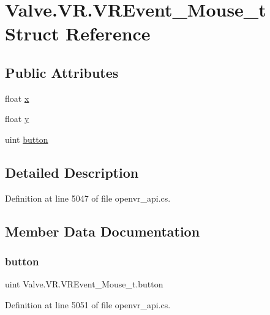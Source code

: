 \hypertarget{struct_valve_1_1_v_r_1_1_v_r_event___mouse__t}{}\section{Valve.\+V\+R.\+V\+R\+Event\+\_\+\+Mouse\+\_\+t Struct Reference}
\label{struct_valve_1_1_v_r_1_1_v_r_event___mouse__t}
\subsection*{Public Attributes}
\begin{DoxyCompactItemize}
\item 
float \mbox{\hyperlink{struct_valve_1_1_v_r_1_1_v_r_event___mouse__t_a0ae7a397a8afdd916e32ae514757c4f8}{x}}
\item 
float \mbox{\hyperlink{struct_valve_1_1_v_r_1_1_v_r_event___mouse__t_acca7abe627d56fa8b2dc3e67cc5511d4}{y}}
\item 
uint \mbox{\hyperlink{struct_valve_1_1_v_r_1_1_v_r_event___mouse__t_a339e5d9fe029ec4e1f64a590d4f12e8a}{button}}
\end{DoxyCompactItemize}


\subsection{Detailed Description}


Definition at line 5047 of file openvr\+\_\+api.\+cs.



\subsection{Member Data Documentation}
\mbox{\label{struct_valve_1_1_v_r_1_1_v_r_event___mouse__t_a339e5d9fe029ec4e1f64a590d4f12e8a}} 
\subsubsection{\texorpdfstring{button}{button}}
{\footnotesize\ttfamily uint Valve.\+V\+R.\+V\+R\+Event\+\_\+\+Mouse\+\_\+t.\+button}



Definition at line 5051 of file openvr\+\_\+api.\+cs.

